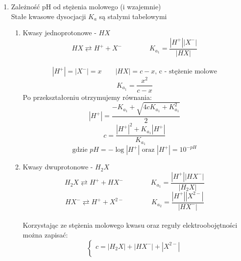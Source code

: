 \documentclass[polish,polish,a4paper,12pt]{article}
\begin{document}
	\begin{enumerate}
		\item Zależność pH od stężenia molowego (i wzajemnie)\\
		Stałe kwasowe dysocjacji $K_a$ są stałymi tabelowymi
		\begin{enumerate}
			\item Kwasy jednoprotonowe - $HX$
			\begin{equation*}
				HX \rightleftarrows H^+ + X^- \hspace{4em}K_{a_1} = \frac{|H^+||X^-|}{|HX|}
			\end{equation*}\\
			\begin{equation*}
				|H^+| = |X^-| = x \hspace{2em} |HX| = c-x \text{, c - stężenie molowe}
			\end{equation*}
			\begin{equation*}
				K_{a_1} = \frac{x^2}{c-x}
			\end{equation*}
			Po przekształceniu otrzymujemy równania:\\
			\begin{equation*}
				|H^+| = \frac{-K_{a_1} + \sqrt{4cK_{a_1} + K_{a_1}^2}}{2}
			\end{equation*}
			\begin{equation*}
				c = \frac{|H^+|^2+K_{a_1}|H^+|}{K_{a_1}}
			\end{equation*}
			\begin{equation*}
				\text{gdzie } pH = -\log |H^+| \text{ oraz } |H^+| = 10^{-pH}
			\end{equation*}
			\item Kwasy dwuprotonowe - $H_2X$
			\begin{equation*}
				H_2X \rightleftarrows H^+ + HX^- \hspace{4em} K_{a_1} = \frac{|H^+||HX^-|}{|H_2X|}
			\end{equation*}
			\begin{equation*}
				HX^- \rightleftarrows H^+ + X^{2-} \hspace{4em} K_{a_2} = \frac{|H^+||X^{2-}|}{|HX^-|}
			\end{equation*}\\
			Korzystając ze stężenia molowego kwasu oraz reguły elektroobojętności można zapisać:\\
			\begin{equation*}
				\begin{cases}
					c = |H_2X| + |HX^-| + |X^{2-}|\\

\end{cases}
\end{equation*}
\end{enumerate}
\end{enumerate}
\end{document}
